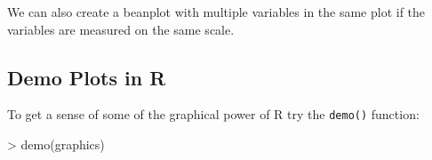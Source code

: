 We can also create a beanplot with multiple variables in the same plot
if the variables are measured on the same scale.
%


\subsection{Demo Plots in R}

To get a sense of some of the graphical power of R try the
\lstinline!demo()! function:
%
\begin{R}
> demo(graphics)
\end{R}
